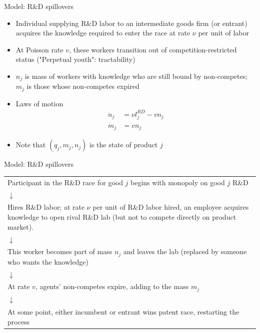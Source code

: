 \documentclass[english,usenames,dvipsnames]{beamer}
\begin{document}
\begin{frame}{Model: R\&D spillovers}
\begin{itemize}
	\item Individual supplying R\&D labor to an intermediate goods firm (or entrant) acquires the knowledge required to enter the race at rate $\nu$ per unit of labor
	\item At Poisson rate $v$, these workers transition out of competition-restricted status ("Perpetual youth": tractability)
	\item $n_j$ is mass of workers with knowledge who are still bound by non-competes; $m_j$ is those whose non-competes expired 
	\item Laws of motion
	\begin{align*}
	\dot{n}_j &= \nu l_j^{RD} - vn_j \\
	\dot{m}_j &= vn_j
	\end{align*}
	\item Note that $(q_j,m_j,n_j)$ is the state of product $j$	
\end{itemize}
\end{frame}

\begin{frame}{Model: R\&D spillovers}
\begin{table}
	\begin{tabular}{p{}}
		\centering
		Participant in the R\&D race for good $j$ begins with monopoly on good $j$ R\&D \\
		 $\downarrow$\\
		Hires R\&D labor; at rate $\nu$ per unit of R\&D labor hired, an employee acquires knowledge to open rival R\&D lab (but not to compete directly on product market). \\
		$\downarrow$\\
		This worker becomes part of mass $n_j$ and leaves the lab (replaced by someone who wants the knowledge)\\ 
		$\downarrow$\\
		At rate $v$, agents' non-competes expire, adding to the mass $m_j$ \\
		$\downarrow$\\
		At some point, either incumbent or entrant wins patent race, restarting the process 
	\end{tabular}
\end{table}
\end{frame}
\end{document}
